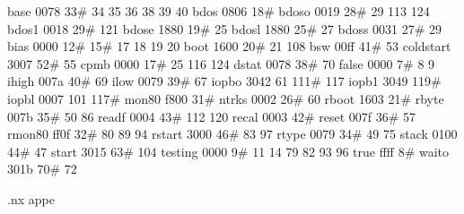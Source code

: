 base              0078           33#     34      35      36      38   39   40
bdos              0806           18#
bdoso             0019           28#     29     113     124
bdos1             0018           29#    121
bdose             1880           19#     25
bdosl             1880           25#     27
bdoss             0031           27#     29
bias              0000           12#     15#     17      18      19   20
boot              1600           20#     21     108
bsw               00ff           41#     53
coldstart         3007           52#     55
cpmb              0000           17#     25     116     124
dstat             0078           38#     70
false             0000            7#      8       9
ihigh             007a           40#     69
ilow              0079           39#     67
iopbo             3042           61     111#    117
iopb1             3049          119#
iopbl             0007          101     117#
mon80             f800           31#
ntrks             0002           26#     60
rboot             1603           21#
rbyte             007b           35#     50      86
readf             0004           43#    112     120
recal             0003           42#
reset             007f           36#     57
rmon80            ff0f           32#     80      89      94
rstart            3000           46#     83      97
rtype             0079           34#     49      75
stack             0100           44#     47
start             3015           63#    104
testing           0000            9#     11      14      79      82   93   96
true              ffff            8#
waito             301b           70#     72

.nx appe
